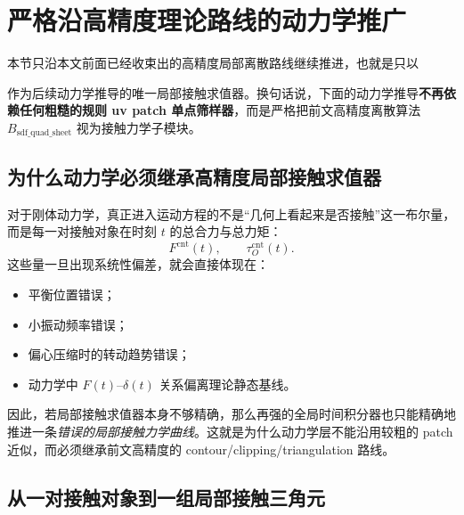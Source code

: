 \documentclass[12pt,a4paper]{ctexart}
\begin{document}
\section{严格沿高精度理论路线的动力学推广}

本节只沿本文前面已经收束出的高精度局部离散路线继续推进，也就是只以
\begin{center}
\end{center}
作为后续动力学推导的唯一局部接触求值器。换句话说，下面的动力学推导\textbf{不再依赖任何粗糙的规则 uv patch 单点筛样器}，而是严格把前文高精度离散算法 $B_{\mathrm{sdf\_quad\_sheet}}$ 视为接触力学子模块。

\subsection{为什么动力学必须继承高精度局部接触求值器}

对于刚体动力学，真正进入运动方程的不是“几何上看起来是否接触”这一布尔量，而是每一对接触对象在时刻 $t$ 的总合力与总力矩：
\begin{equation}
    F^{\mathrm{cnt}}(t),
    \qquad
    \tau^{\mathrm{cnt}}_O(t).
\end{equation}
这些量一旦出现系统性偏差，就会直接体现在：
\begin{itemize}
    \item 平衡位置错误；
    \item 小振动频率错误；
    \item 偏心压缩时的转动趋势错误；
    \item 动力学中 $F(t)$--$\delta(t)$ 关系偏离理论静态基线。
\end{itemize}
因此，若局部接触求值器本身不够精确，那么再强的全局时间积分器也只能精确地推进一条\emph{错误的局部接触力学曲线}。这就是为什么动力学层不能沿用较粗的 patch 近似，而必须继承前文高精度的 contour/clipping/triangulation 路线。

\subsection{从一对接触对象到一组局部接触三角元}
\end{document}
